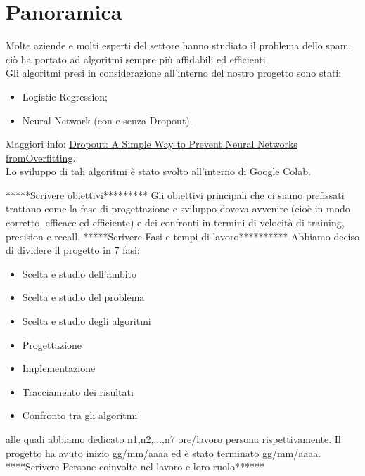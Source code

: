 \newpage
\section{Panoramica}
Molte aziende e molti esperti del settore hanno studiato il problema dello spam, ciò ha portato ad algoritmi sempre più affidabili ed efficienti.\\
Gli algoritmi presi in considerazione all'interno del nostro progetto sono stati:
\begin{itemize}
	\item Logistic Regression;
	\item Neural Network (con e senza Dropout). 
\end{itemize}
Maggiori info: \href{http://www.jmlr.org/papers/volume15/srivastava14a/srivastava14a.pdf}{Dropout: A Simple Way to Prevent Neural Networks fromOverfitting}.\\
Lo sviluppo di tali algoritmi è stato svolto all'interno di \href{https://colab.research.google.com/notebooks/welcome.ipynb}{Google Colab}. 

*****Scrivere obiettivi*********
Gli obiettivi principali che ci siamo prefissati trattano come la fase di progettazione e sviluppo doveva avvenire (cioè in modo corretto, efficace ed efficiente) e dei confronti in termini di velocità di training, precision e recall.
*****Scrivere Fasi e tempi di lavoro**********
Abbiamo deciso di dividere il progetto in 7 fasi:
\begin{itemize}
	\item{Scelta e studio dell'ambito}
	\item{Scelta e studio del problema}
	\item{Scelta e studio degli algoritmi}
	\item{Progettazione}
	\item{Implementazione}
	\item{Tracciamento dei risultati}
	\item{Confronto tra gli algoritmi}
\end{itemize}
alle quali abbiamo dedicato n1,n2,...,n7 ore/lavoro persona rispettivamente.
Il progetto ha avuto inizio gg/mm/aaaa ed è stato terminato gg/mm/aaaa.
****Scrivere Persone coinvolte nel lavoro e loro ruolo******

\newpage